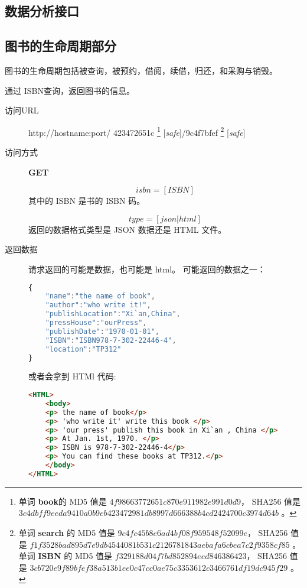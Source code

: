 \documentclass[UTF8]{article}
\def\safe{[\textit{safe}]}
\def\GET{\textbf{GET}}
\def\viaurl#1{\item[访问URL] #1}
\def\viareq#1{\item[访问方式] #1}
\def\rtdata{\item[返回数据]}
\begin{document}
        \subsection{数据分析接口}




        \subsection{图书的生命周期部分}
        图书的生命周期包括被查询，被预约，借阅，续借，归还，和采购与销毁。






        通过 ISBN查询，返回图书的信息。
        \begin{description}

        	\viaurl http://hostname:port/
        	423472651c
        	\footnote{单词 \textbf{book}的
        		MD5 值是 $4f98663772651c870e911982e991d0d9$，
        		SHA256 值是
                $3c4dbff9eeda9410a0b9eb423472981db8997d666388b4cd2424700c3974d64b$
                。
        		}
	        \safe/9c4f7bfef
	        \footnote{
	        	单词 \textbf{search} 的
	        	MD5 值是 $9c4fc45b8e6ad4bf08f959548f52099e$，
	        	SHA256 值是
                $f1f3528bad895d7e9db4544081b531c2126781843aebafa6cbea7c2f9358cf85$
                。
	        	单词 \textbf{ISBN} 的
	        	MD5 值是 $f329188d04f7bd852894eed846386423$，
	        	SHA256 值是
                $3cb720e9f89bfef38a513b1ee0c47cc0ae75c3353612c3466761df19dc945f29$
                 。
	        	}
	        \safe


	        \viareq \GET


	        $$isbn=[ISBN]$$
	        其中的 ISBN 是书的 ISBN 码。


	        $$type=[json|html]$$
	        返回的数据格式类型是 JSON 数据还是 HTML 文件。

	        \rtdata 请求返回的可能是数据，也可能是 html。
	        可能返回的数据之一：
\begin{lstlisting}[language=JavaScript]
{
	"name":"the name of book",
	"author":"who write it!",
	"publishLocation":"Xi`an,China",
	"pressHouse":"ourPress",
	"publishDate":"1970-01-01",
	"ISBN":"ISBN978-7-302-22446-4",
	"location":"TP312"
}
\end{lstlisting}
	       或者会拿到 HTMl 代码:
\begin{lstlisting}[language=HTML]
<HTML>
	<body>
	<p> the name of book</p>
	<p> 'who write it' write this book </p>
	<p> 'our press' publish this book in Xi`an , China </p>
	<p> At Jan. 1st, 1970. </p>
	<p> ISBN is 978-7-302-22446-4</p>
	<p> You can find these books at TP312.</p>
	</body>
</HTML>
\end{lstlisting}
        \end{description}
\end{document}
